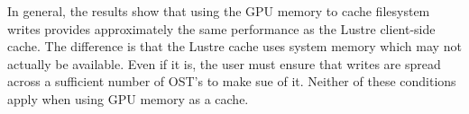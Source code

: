 In general, the results show that using the GPU memory to cache filesystem writes provides approximately the same performance as the Lustre client-side cache.  The difference is that the Lustre cache uses system memory which may not actually be available.  Even if it is, the user must ensure that writes are spread across a sufficient number of OST's to make sue of it.  Neither of these conditions apply when using GPU memory as a cache.



